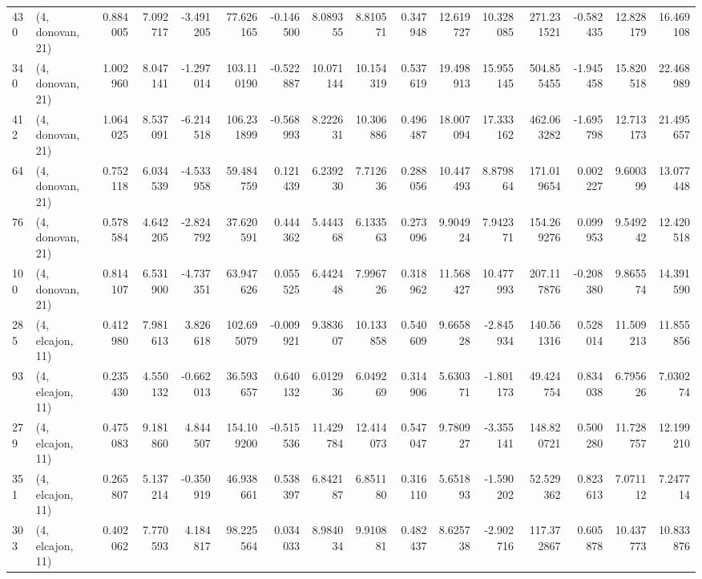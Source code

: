 \begin{tabular}{llrrrrrrrrrrrrrr}
430 &  (4, donovan, 21) &   0.884005 &   7.092717 &  -3.491205 &    77.626165 &  -0.146500 &   8.089355 &   8.810571 &  0.347948 &  12.619727 &  10.328085 &    271.231521 &   -0.582435 &   12.828179 &   16.469108 \\
340 &  (4, donovan, 21) &   1.002960 &   8.047141 &  -1.297014 &   103.110190 &  -0.522887 &  10.071144 &  10.154319 &  0.537619 &  19.498913 &  15.955145 &    504.855455 &   -1.945458 &   15.820518 &   22.468989 \\
412 &  (4, donovan, 21) &   1.064025 &   8.537091 &  -6.214518 &   106.231899 &  -0.568993 &   8.222631 &  10.306886 &  0.496487 &  18.007094 &  17.333162 &    462.063282 &   -1.695798 &   12.713173 &   21.495657 \\
64  &  (4, donovan, 21) &   0.752118 &   6.034539 &  -4.533958 &    59.484759 &   0.121439 &   6.239230 &   7.712636 &  0.288056 &  10.447493 &   8.879864 &    171.019654 &    0.002227 &    9.600399 &   13.077448 \\
76  &  (4, donovan, 21) &   0.578584 &   4.642205 &  -2.824792 &    37.620591 &   0.444362 &   5.444368 &   6.133563 &  0.273096 &   9.904924 &   7.942371 &    154.269276 &    0.099953 &    9.549242 &   12.420518 \\
100 &  (4, donovan, 21) &   0.814107 &   6.531900 &  -4.737351 &    63.947626 &   0.055525 &   6.442448 &   7.996726 &  0.318962 &  11.568427 &  10.477993 &    207.117876 &   -0.208380 &    9.865574 &   14.391590 \\
285 &  (4, elcajon, 11) &   0.412980 &   7.981613 &   3.826618 &   102.695079 &  -0.009921 &   9.383607 &  10.133858 &  0.540609 &   9.665828 &  -2.845934 &    140.561316 &    0.528014 &   11.509213 &   11.855856 \\
93  &  (4, elcajon, 11) &   0.235430 &   4.550132 &  -0.662013 &    36.593657 &   0.640132 &   6.012936 &   6.049269 &  0.314906 &   5.630371 &  -1.801173 &     49.424754 &    0.834038 &    6.795626 &    7.030274 \\
279 &  (4, elcajon, 11) &   0.475083 &   9.181860 &   4.844507 &   154.109200 &  -0.515536 &  11.429784 &  12.414073 &  0.547047 &   9.780927 &  -3.355141 &    148.820721 &    0.500280 &   11.728757 &   12.199210 \\
351 &  (4, elcajon, 11) &   0.265807 &   5.137214 &  -0.350919 &    46.938661 &   0.538397 &   6.842187 &   6.851180 &  0.316110 &   5.651893 &  -1.590202 &     52.529362 &    0.823613 &    7.071112 &    7.247714 \\
303 &  (4, elcajon, 11) &   0.402062 &   7.770593 &   4.184817 &    98.225564 &   0.034033 &   8.984034 &   9.910881 &  0.482437 &   8.625738 &  -2.902716 &    117.372867 &    0.605878 &   10.437773 &   10.833876 \\

\end{tabular}
